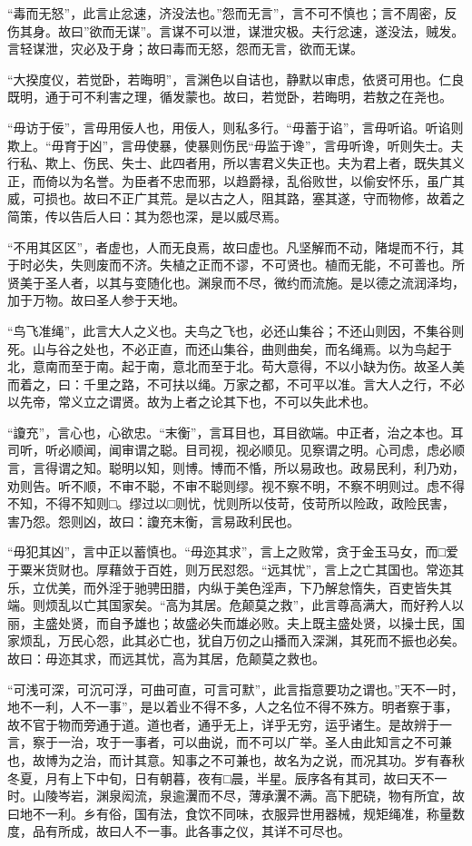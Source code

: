\documentclass[]{article}
\begin{document}
``毒而无怒''，此言止忿速，济没法也。''怨而无言''，言不可不慎也；言不周密，反伤其身。故曰''欲而无谋''。言谋不可以泄，谋泄灾极。夫行忿速，遂没法，贼发。言轻谋泄，灾必及于身；故曰毒而无怒，怨而无言，欲而无谋。

``大揆度仪，若觉卧，若晦明''，言渊色以自诘也，静默以审虑，依贤可用也。仁良既明，通于可不利害之理，循发蒙也。故曰，若觉卧，若晦明，若敖之在尧也。

``毋访于佞''，言毋用佞人也，用佞人，则私多行。``毋蓄于谄''，言毋听谄。听谄则欺上。``毋育于凶''，言毋使暴，使暴则伤民``毋监于谗''，言毋听谗，听则失士。夫行私、欺上、伤民、失士、此四者用，所以害君义失正也。夫为君上者，既失其义正，而倚以为名誉。为臣者不忠而邪，以趋爵禄，乱俗败世，以偷安怀乐，虽广其威，可损也。故曰不正广其荒。是以古之人，阻其路，塞其遂，守而物修，故着之简策，传以告后人曰：其为怨也深，是以威尽焉。

``不用其区区''，者虚也，人而无良焉，故曰虚也。凡坚解而不动，陼堤而不行，其于时必失，失则废而不济。失植之正而不谬，不可贤也。植而无能，不可善也。所贤美于圣人者，以其与变随化也。渊泉而不尽，微约而流施。是以德之流润泽均，加于万物。故曰圣人参于天地。

``鸟飞准绳''，此言大人之义也。夫鸟之飞也，必还山集谷；不还山则因，不集谷则死。山与谷之处也，不必正直，而还山集谷，曲则曲矣，而名绳焉。以为鸟起于北，意南而至于南。起于南，意北而至于北。苟大意得，不以小缺为伤。故圣人美而着之，曰：千里之路，不可扶以绳。万家之都，不可平以准。言大人之行，不必以先帝，常义立之谓贤。故为上者之论其下也，不可以失此术也。

``讂充''，言心也，心欲忠。``末衡''，言耳目也，耳目欲端。中正者，治之本也。耳司听，听必顺闻，闻审谓之聪。目司视，视必顺见。见察谓之明。心司虑，虑必顺言，言得谓之知。聪明以知，则博。博而不惛，所以易政也。政易民利，利乃劝，劝则告。听不顺，不审不聪，不审不聪则缪。视不察不明，不察不明则过。虑不得不知，不得不知则□。缪过以□则忧，忧则所以伎苛，伎苛所以险政，政险民害，害乃怨。怨则凶，故曰：讂充末衡，言易政利民也。

``毋犯其凶''，言中正以蓄慎也。``毋迩其求''，言上之败常，贪于金玉马女，而□爱于粟米货财也。厚藉敛于百姓，则万民怼怨。``远其忧''，言上之亡其国也。常迩其乐，立优美，而外淫于驰骋田腊，内纵于美色淫声，下乃解怠惰失，百吏皆失其端。则烦乱以亡其国家矣。``高为其居。危颠莫之救''，此言尊高满大，而好矜人以丽，主盛处贤，而自予雄也；故盛必失而雄必败。夫上既主盛处贤，以操士民，国家烦乱，万民心怨，此其必亡也，犹自万仞之山播而入深渊，其死而不振也必矣。故曰：毋迩其求，而远其忧，高为其居，危颠莫之救也。

``可浅可深，可沉可浮，可曲可直，可言可默''，此言指意要功之谓也。''天不一时，地不一利，人不一事''，是以着业不得不多，人之名位不得不殊方。明者察于事，故不官于物而旁通于道。道也者，通乎无上，详乎无穷，运乎诸生。是故辨于一言，察于一治，攻于一事者，可以曲说，而不可以广举。圣人由此知言之不可兼也，故博为之治，而计其意。知事之不可兼也，故名为之说，而况其功。岁有春秋冬夏，月有上下中旬，日有朝暮，夜有□晨，半星。辰序各有其司，故曰天不一时。山陵岑岩，渊泉闳流，泉逾瀷而不尽，薄承瀷不满。高下肥硗，物有所宜，故曰地不一利。乡有俗，国有法，食饮不同味，衣服异世用器械，规矩绳准，称量数度，品有所成，故曰人不一事。此各事之仪，其详不可尽也。
\end{document}
